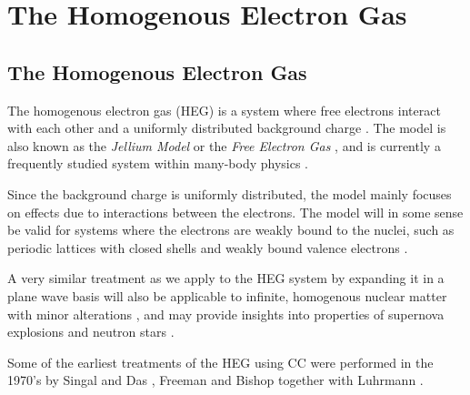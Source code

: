 
\chapter{The Homogenous Electron Gas} %

\label{Chapter6} %



\section{The Homogenous Electron Gas}

The homogenous electron gas (HEG) is a system where free electrons
interact with each other and a uniformly distributed background
charge \cite{GrossRungeHeinonen}. The model is also known as the
\emph{Jellium Model} or the \emph{Free Electron  Gas} \cite{GrossRungeHeinonen}, and is currently a frequently
studied system within many-body physics \cite{Shepherd2014,Baardsen2014, Roggero2013, Shepherd2012}.

Since the background charge is uniformly distributed, the model mainly
focuses on effects due to interactions between the electrons. The
model will in some sense be valid for systems where the electrons are
weakly bound to the nuclei, such as periodic lattices with closed
shells and weakly bound valence electrons \cite{GrossRungeHeinonen}.

A very similar treatment as we apply to the HEG system by expanding it
in a plane wave basis will also be applicable to infinite, homogenous
nuclear matter with minor alterations \cite{Baardsen2014}, and
may provide insights into properties of supernova explosions
\cite{burrows2013} and neutron stars \cite{weber1999,hh2000}.

Some of the earliest treatments of the HEG using CC were performed in
the 1970's by Singal and Das
\cite{Singal1973}, Freeman \cite{Freeman1977} and Bishop
together with Luhrmann \cite{Bishop1978,Bishop1982}.



